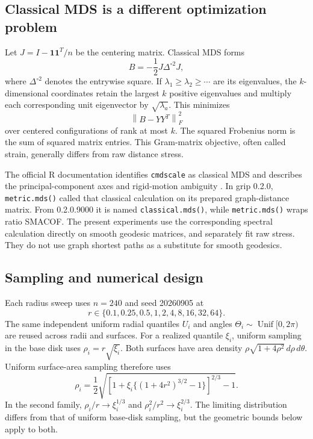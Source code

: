 \documentclass[11pt]{article}
\theoremstyle{remark}\newtheorem{remark}[proposition]{Remark}
\newcommand{\one}{\mathbf 1}
\newcommand{\norm}[1]{\left\lVert#1\right\rVert}
\begin{document}
\subsection{Classical MDS is a different optimization problem}
Let $J=I-\one\one^T/n$ be the centering matrix. Classical MDS forms
\begin{equation}\label{eq:classical}
 B=-\frac12J\Delta^{\circ2}J,
\end{equation}
where $\Delta^{\circ2}$ denotes the entrywise square. If
$\lambda_1\ge\lambda_2\ge\cdots$ are its eigenvalues, the $k$-dimensional
coordinates retain the largest $k$ positive eigenvalues and multiply each
corresponding unit eigenvector by $\sqrt{\lambda_a}$. This minimizes
\begin{equation}
 \norm{B-YY^T}_F^2
\end{equation}
over centered configurations of rank at most $k$. The squared Frobenius norm
is the sum of squared matrix entries. This Gram-matrix objective,
often called strain, generally differs from raw distance stress.

The official R documentation identifies \texttt{cmdscale} as classical MDS
and describes the principal-component axes and rigid-motion ambiguity
\citep{rcmdscale}. In grip 0.2.0, \texttt{metric.mds()} called that classical
calculation on its prepared graph-distance matrix. From 0.2.0.9000 it is named
\texttt{classical.mds()}, while \texttt{metric.mds()} wraps ratio SMACOF. The present
experiments use the corresponding spectral calculation directly on smooth
geodesic matrices, and separately fit raw stress. They do not use graph
shortest paths as a substitute for smooth geodesics.

\subsection{Sampling and numerical design}\label{sec:design}
Each radius sweep uses $n=240$ and seed 20260905 at
\begin{equation}
 r\in\{0.1,0.25,0.5,1,2,4,8,16,32,64\}.
\end{equation}
The same independent uniform radial quantiles $U_i$ and angles
$\Theta_i\sim\operatorname{Unif}[0,2\pi)$ are reused across radii and surfaces.
For a realized quantile $\xi_i$, uniform sampling in the base disk uses
$\rho_i=r\sqrt{\xi_i}$. Both surfaces have area density
$\rho\sqrt{1+4\rho^2}\,d\rho\,d\theta$. Uniform surface-area sampling therefore uses
\begin{equation}\label{eq:area-sampling}
 \rho_i=\frac12\sqrt{\left[1+\xi_i\{(1+4r^2)^{3/2}-1\}\right]^{2/3}-1}.
\end{equation}
In the second family, $\rho_i/r\to \xi_i^{1/3}$ and
$\rho_i^2/r^2\to \xi_i^{2/3}$. The limiting distribution differs from that of
uniform base-disk sampling, but the geometric bounds below apply to both.
\end{document}
